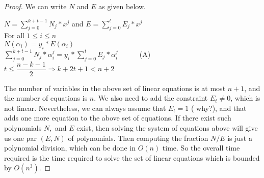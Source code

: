 \begin{proof}
 We can write $N$ and $E$ as given below.

\begin{center}
$N=\sum_{j=0}^{k+t-1}N_{j}*x^{j}$  and  $E=\sum_{j=0}^{t}E_{j}*x^{j}$\\
\vspace{8 mm}
For all $1\leq i\leq n$\\
\vspace{4 mm}
$N(\alpha_{i})=y_{i}*E(\alpha_{i})$\\
\vspace{4 mm}
$\sum_{j=0}^{k+t-1}N_{j}*\alpha_{i}^{j}= y_{i}*\sum_{j=0}^{t}E_{j}*\alpha_{i}^{j}$~~~~~~(A)\\
\vspace{4 mm}
$t\le\dfrac{n-k-1}{2}\Longrightarrow k+2t+1<n+2$
\end{center}
 The number of variables in the above set of linear equations is  at most  $n+1$,  and the number of equations is $n$.    We also need to add the constraint $E_{t}\neq0$, which is not linear.
Nevertheless, we can always assume that $E_t=1$ ({\color{blue} why?}), and that adds one more equation to the above set of equations.  If there exist such polynomials $N,$ and $E$ exist, then
solving the system of equations above will give us one par $(E,N)$ of polynomials. Then computing the fraction $N/E$ is just a polynomial division, which can be done in $O(n)$ time. So the overall time required is the time 
required to solve the set of linear equations which is bounded by $O(n^3)$.
\end{proof}

